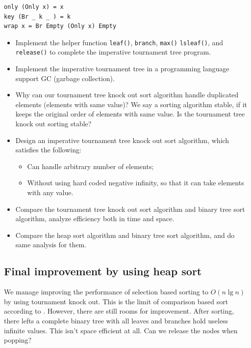 \documentclass[b5paper]{article}
\begin{document}
\lstset{language=Haskell}
\begin{lstlisting}
only (Only x) = x
key (Br _ k _ ) = k
wrap x = Br Empty (Only x) Empty
\end{lstlisting}

\begin{Exercise}
  \begin{itemize}
    \item Implement the helper function \texttt{leaf()}, \texttt{branch}, \texttt{max()} \texttt{lsleaf()}, and \texttt{release()} to complete the imperative tournament tree program.
    \item Implement the imperative tournament tree in a programming language support GC (garbage collection).
    \item Why can our tournament tree knock out sort algorithm handle duplicated elements (elements with same value)? We say a sorting algorithm stable, if it keeps the original order of elements with same value. Is the tournament tree knock out sorting stable?
    \item Design an imperative tournament tree knock out sort algorithm, which satisfies the following:
      \begin{itemize}
        \item Can handle arbitrary number of elements;
        \item Without using hard coded negative infinity, so that it can take elements with any value.
      \end{itemize}
    \item Compare the tournament tree knock out sort algorithm and binary tree sort algorithm, analyze efficiency both in time and space.
    \item Compare the heap sort algorithm and binary tree sort algorithm, and do same analysis for them.
  \end{itemize}
\end{Exercise}

\subsection{Final improvement by using heap sort}

We manage improving the performance of selection based sorting to $O(n \lg n)$ by using tournament knock out.
This is the limit of comparison based sort according to \cite{TAOCP}. However, there are still rooms for improvement.
After sorting, there lefts a complete binary tree with all leaves and branches hold useless infinite values.
This isn't space efficient at all. Can we release the nodes when popping?
\end{document}
